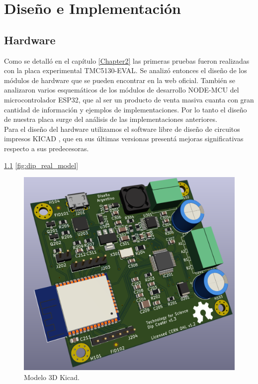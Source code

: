 
\chapter{Diseño e Implementación} %

\label{Chapter3} %

\section{Hardware}

Como se detalló en el capítulo \ref{Chapter2} las primeras pruebas fueron realizadas con la placa experimental TMC5130-EVAL. Se analizó entonces el diseño de los módulos de hardware que se pueden encontrar en la web oficial\citep{3_web_trinamic}. También se analizaron varios esquemáticos de los módulos de desarrollo NODE-MCU del microcontrolador ESP32, que al ser un producto de venta masiva cuanta con gran cantidad de información y ejemplos de implementaciones. Por lo tanto el diseño de nuestra placa surge del análisis de las implementaciones anteriores.
\\
Para el diseño del hardware utilizamos el software libre de diseño de circuitos impresos KICAD \citep{web_kicad}, que en sus últimas versionas presentá mejoras significativas respecto a sus predecesoras.

\ref{fig:dip_3d_model}
\ref{fig:dip_real_model}

\begin{figure}[htbp]
	\centering
	\includegraphics[width=.5\textwidth]{./Figures/dip_3d_model.pdf}
	\caption{Modelo 3D Kicad.}
	\label{fig:dip_3d_model}
\end{figure}
         

